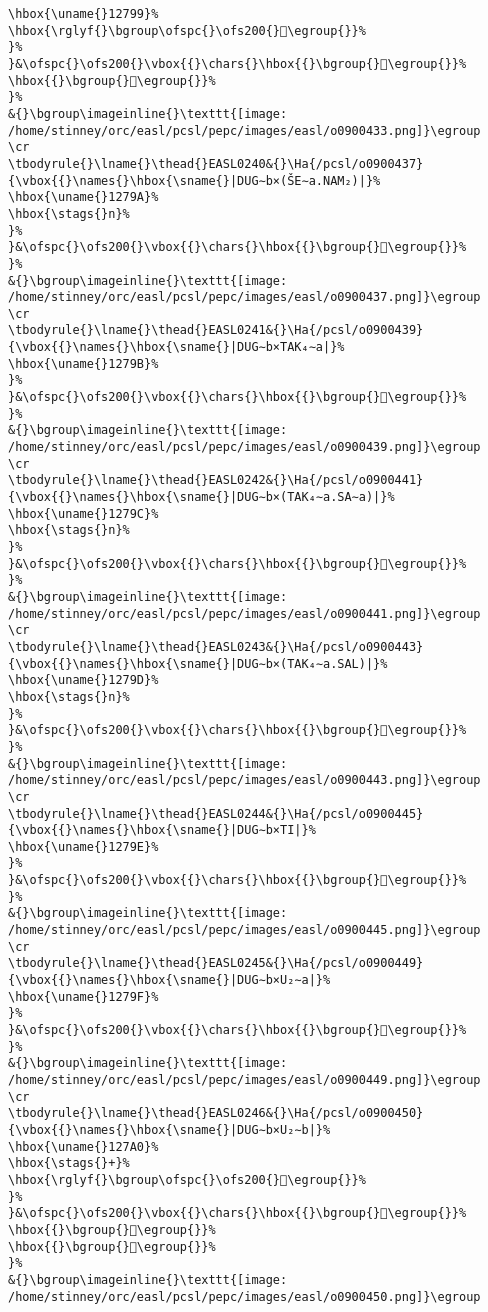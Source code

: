\begin{verbatim}
\hbox{\uname{}12799}%
\hbox{\rglyf{}\bgroup\ofspc{}\ofs200{}𒞙\egroup{}}%
}%
}&\ofspc{}\ofs200{}\vbox{{}\chars{}\hbox{{}\bgroup{}𒞴\egroup{}}%
\hbox{{}\bgroup{}𒞙\egroup{}}%
}%
&{}\bgroup\imageinline{}\texttt{[image: /home/stinney/orc/easl/pcsl/pepc/images/easl/o0900433.png]}\egroup
\cr
\tbodyrule{}\lname{}\thead{}EASL0240&{}\Ha{/pcsl/o0900437}{\vbox{{}\names{}\hbox{\sname{}|DUG∼b×(ŠE∼a.NAM₂)|}%
\hbox{\uname{}1279A}%
\hbox{\stags{}n}%
}%
}&\ofspc{}\ofs200{}\vbox{{}\chars{}\hbox{{}\bgroup{}𒞚\egroup{}}%
}%
&{}\bgroup\imageinline{}\texttt{[image: /home/stinney/orc/easl/pcsl/pepc/images/easl/o0900437.png]}\egroup
\cr
\tbodyrule{}\lname{}\thead{}EASL0241&{}\Ha{/pcsl/o0900439}{\vbox{{}\names{}\hbox{\sname{}|DUG∼b×TAK₄∼a|}%
\hbox{\uname{}1279B}%
}%
}&\ofspc{}\ofs200{}\vbox{{}\chars{}\hbox{{}\bgroup{}𒞛\egroup{}}%
}%
&{}\bgroup\imageinline{}\texttt{[image: /home/stinney/orc/easl/pcsl/pepc/images/easl/o0900439.png]}\egroup
\cr
\tbodyrule{}\lname{}\thead{}EASL0242&{}\Ha{/pcsl/o0900441}{\vbox{{}\names{}\hbox{\sname{}|DUG∼b×(TAK₄∼a.SA∼a)|}%
\hbox{\uname{}1279C}%
\hbox{\stags{}n}%
}%
}&\ofspc{}\ofs200{}\vbox{{}\chars{}\hbox{{}\bgroup{}𒞜\egroup{}}%
}%
&{}\bgroup\imageinline{}\texttt{[image: /home/stinney/orc/easl/pcsl/pepc/images/easl/o0900441.png]}\egroup
\cr
\tbodyrule{}\lname{}\thead{}EASL0243&{}\Ha{/pcsl/o0900443}{\vbox{{}\names{}\hbox{\sname{}|DUG∼b×(TAK₄∼a.SAL)|}%
\hbox{\uname{}1279D}%
\hbox{\stags{}n}%
}%
}&\ofspc{}\ofs200{}\vbox{{}\chars{}\hbox{{}\bgroup{}𒞝\egroup{}}%
}%
&{}\bgroup\imageinline{}\texttt{[image: /home/stinney/orc/easl/pcsl/pepc/images/easl/o0900443.png]}\egroup
\cr
\tbodyrule{}\lname{}\thead{}EASL0244&{}\Ha{/pcsl/o0900445}{\vbox{{}\names{}\hbox{\sname{}|DUG∼b×TI|}%
\hbox{\uname{}1279E}%
}%
}&\ofspc{}\ofs200{}\vbox{{}\chars{}\hbox{{}\bgroup{}𒞞\egroup{}}%
}%
&{}\bgroup\imageinline{}\texttt{[image: /home/stinney/orc/easl/pcsl/pepc/images/easl/o0900445.png]}\egroup
\cr
\tbodyrule{}\lname{}\thead{}EASL0245&{}\Ha{/pcsl/o0900449}{\vbox{{}\names{}\hbox{\sname{}|DUG∼b×U₂∼a|}%
\hbox{\uname{}1279F}%
}%
}&\ofspc{}\ofs200{}\vbox{{}\chars{}\hbox{{}\bgroup{}𒞟\egroup{}}%
}%
&{}\bgroup\imageinline{}\texttt{[image: /home/stinney/orc/easl/pcsl/pepc/images/easl/o0900449.png]}\egroup
\cr
\tbodyrule{}\lname{}\thead{}EASL0246&{}\Ha{/pcsl/o0900450}{\vbox{{}\names{}\hbox{\sname{}|DUG∼b×U₂∼b|}%
\hbox{\uname{}127A0}%
\hbox{\stags{}+}%
\hbox{\rglyf{}\bgroup\ofspc{}\ofs200{}𒞠\egroup{}}%
}%
}&\ofspc{}\ofs200{}\vbox{{}\chars{}\hbox{{}\bgroup{}𒞶\egroup{}}%
\hbox{{}\bgroup{}𒞺\egroup{}}%
\hbox{{}\bgroup{}𒞠\egroup{}}%
}%
&{}\bgroup\imageinline{}\texttt{[image: /home/stinney/orc/easl/pcsl/pepc/images/easl/o0900450.png]}\egroup

\end{verbatim}
